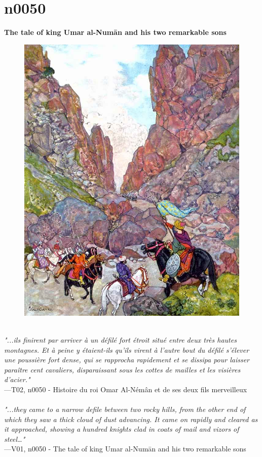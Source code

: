 \documentclass[../Carre_nights.tex]{subfiles}
\begin{document}
\newpage

\section{n0050}
\textbf{\Large{The tale of king Umar al-Num\=an and his two remarkable sons}} \\

\begin{figure}[ht]
\centering
\includegraphics[height=\figsize]{illustrations/volume_2/T02, n0050 - Histoire du roi Omar Al-Némân et de ses deux fils merveilleux.jpg}
\end{figure}

\textit{\\
"...ils finirent par arriver à un défilé fort étroit situé entre deux très hautes montagnes. Et à peine y étaient-ils qu’ils virent à l’autre bout du défilé s’élever une poussière fort dense, qui se rapprocha rapidement et se dissipa pour laisser paraître cent cavaliers, disparaissant sous les cottes de mailles et les visières d’acier."} \\
—T02, n0050 - Histoire du roi Omar Al-Némân et de ses deux fils merveilleux \\~\\
\textit{"...they came to a narrow defile between two rocky hills, from the other end of which they saw a thick cloud of dust advancing. It came on rapidly and cleared as it approached, showing a hundred knights clad in coats of mail and vizors of steel…"} \\
—V01, n0050 - The tale of king Umar al-Num\=an and his two remarkable sons
\end{document}
